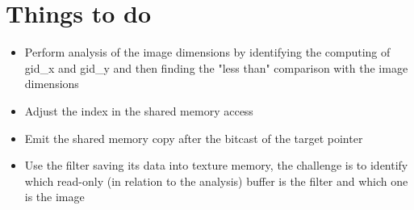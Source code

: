 \documentclass{article}
\begin{document}
\section{Things to do}
\begin{itemize}
\item Perform analysis of the image dimensions by identifying the computing of gid\_x and gid\_y and then finding the "less than" comparison with the image dimensions
\item Adjust the index in the shared memory access
\item Emit the shared memory copy after the bitcast of the target pointer
\item Use the filter saving its data into texture memory, the challenge is to identify which read-only (in relation to the analysis) buffer is the filter and which one is the image
\end{itemize}
\end{document}
